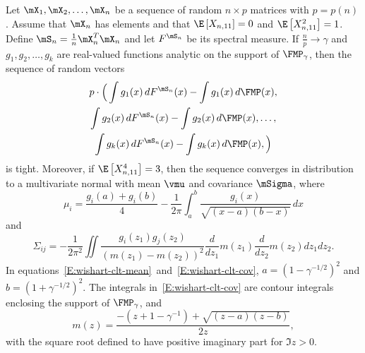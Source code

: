 \begin{theorem}
    Let $\mX_1, \mX_2, \ldots, \mX_n$ be a sequence of random $n\times p$ matrices with $p = p(n)$.  Assume that $\mX_n$ has \iid elements and that $\E\left[ X_{n,11} \right] = 0$ and $\E\left[ X_{n,11}^2 \right] = 1$.  Define $\mS_n = \frac{1}{n} \mX_n^T \mX_n$ and let $F^{\mS_n}$ be its spectral measure.  If $\frac{n}{p} \to \gamma$ and $g_1, g_2, \ldots, g_k$ are real-valued functions analytic on the support of $\FMP_\gamma$, then the sequence of random vectors
    \begin{multline*}
        p
        \cdot
        \Big(
	    \int g_1(x) \, dF^{\mS_n}(x)
	    -
            \int g_1(x) \, d\FMP(x), \\
	    \int g_2(x) \, dF^{\mS_n}(x)
	    -
	    \int g_2(x) \, d\FMP(x),
	    \ldots, \\
            \int g_k(x) \, dF^{\mS_n}(x)
	    -
            \int g_k(x) \, d\FMP(x),
	\Big)
    \end{multline*}
    is tight.
    Moreover, if $\E \left[ X_{n,11}^4 \right] = 3$, then the sequence converges in distribution to a multivariate normal with mean $\vmu$ and covariance $\mSigma$, where 
    \begin{equation}\label{E:wishart-clt-mean}
        \mu_i
	=
	\frac{ g_i(a) + g_i(b) }
             { 4 }
	-
        \frac{1}{2 \pi}
	\int_{a}^{b}
	    \frac{ g_i(x) }
	         { \sqrt{(x-a)(b-x)} }
            \,
            dx
    \end{equation}
    and
    \begin{equation}\label{E:wishart-clt-cov}
	\Sigma_{ij}
	=
	-
	\frac{1}{2 \pi^2}
	\iint
	    \frac{g_i(z_1) g_j(z_2)}
	         {\left( m(z_1) - m(z_2) \right)^2}
	    \frac{d}{dz_1} m(z_1)
	    \frac{d}{dz_2} m(z_2)
	    dz_1 dz_2.
    \end{equation}
    In equations~\eqref{E:wishart-clt-mean}~and~\eqref{E:wishart-clt-cov},
    $a = (1 - \gamma^{-1/2})^2$ and $b = (1 + \gamma^{-1/2})^2$.  The integrals
    in~\eqref{E:wishart-clt-cov} are contour integrals enclosing the support
    of $\FMP_\gamma$, and
    \begin{equation}
        m(z)
        =
	\frac{-(z + 1 - \gamma^{-1}) + \sqrt{(z-a)(z-b)}}{2 z},
    \end{equation}
    with the square root defined to have positive imaginary part for
    $\Im z > 0$.
\end{theorem}

